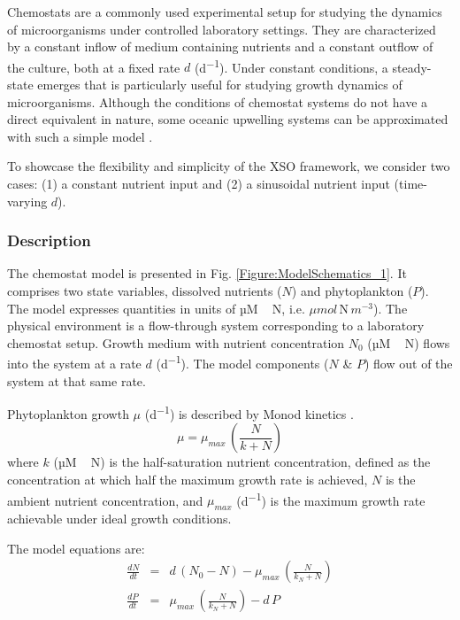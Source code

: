 \documentclass[journal abbreviation, manuscript]{copernicus}
\begin{document}
Chemostats are a commonly used experimental setup for studying the dynamics of microorganisms under controlled laboratory settings. They are characterized by a constant inflow of medium containing nutrients and a constant outflow of the culture, both at a fixed rate $d$ (\unit{d^{-1}}). Under constant conditions, a steady-state emerges that is particularly useful for studying growth dynamics of microorganisms. Although the conditions of chemostat systems do not have a direct equivalent in nature, some oceanic upwelling systems can be approximated with such a simple model \citep{Haefner2005ModelingApplications}.

To showcase the flexibility and simplicity of the XSO framework, we consider two cases: (1) a constant nutrient input and (2) a sinusoidal nutrient input (time-varying $d$).

\subsubsection{Description}
The chemostat model is presented in Fig. \ref{Figure:ModelSchematics_1}. It comprises two state variables, dissolved nutrients ($N$) and phytoplankton ($P$). The model expresses quantities in units of \unit{µM\,N}, i.e. $\mu mol$\,N\,$m^{-3}$). The physical environment is a flow-through system corresponding to a laboratory chemostat setup. Growth medium with nutrient concentration $N_0$ (\unit{µM\,N}) flows into the system at a rate $d$ (\unit{d^{-1}}). The model components ($N$ \& $P$) flow out of the system at that same rate.

Phytoplankton growth $\mu$ (\unit{d^{-1}}) is described by Monod kinetics \citep{Monod1942RecherchesBacteriennes}.
\begin{equation}
    \label{Eq:ChemoMU}
    \mu = \mu_{max}\,\left(\frac{N}{k + N}\right) 
\end{equation}
where $k$ (\unit{µM\,N}) is the half-saturation nutrient concentration, defined as the concentration at which half the maximum growth rate is achieved, $N$ is the ambient nutrient concentration, and $\mu_{max}$ (\unit{d^{-1}}) is the maximum growth rate achievable under ideal growth conditions.

The model equations are:
\begin{eqnarray}
\label{Eq:ChemoN}
\frac{d N}{d t} & = & d\,(N_0 - N) -\mu_{max}\,\left(\frac{N}{k_N + N}\right) \\ 
\frac{d P}{d t} & = & \mu_{max}\,\left(\frac{N}{k_N + N}\right) - d\,P \label{Eq:ChemoP}
\end{eqnarray}
\end{document}
